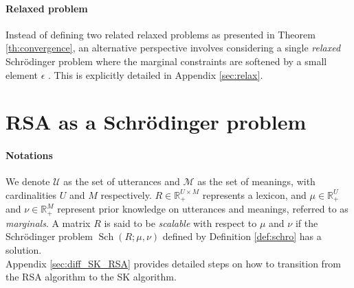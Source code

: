 \documentclass{article}
\newtheorem{prop}{Property}[section] %
\begin{document}
\paragraph{Relaxed problem}
Instead of defining two related relaxed problems as presented in Theorem \ref{th:convergence}, an alternative perspective involves considering a single \textit{relaxed} Schrödinger problem where the marginal constraints are softened by a small element $\epsilon$ \cite{baradat2023convergencesinkhornalgorithmschrodinger}. This is explicitly detailed in Appendix \ref{sec:relax}.

\section{RSA as a Schrödinger problem}\label{sec:RSA_Sch}

\paragraph*{Notations} \label{notation}
We denote $\mathcal{U}$ as the set of utterances and $\mathcal{M}$ as the set of meanings, with cardinalities $U$ and $M$ respectively. $R \in \mathbb{R}^{U \times M}_{+}$ represents a lexicon, and $\mu \in \mathbb{R}^{U}_{+}$ and $\nu \in \mathbb{R}^{M}_{+}$ represent prior knowledge on utterances and meanings, referred to as \textit{marginals}. A matrix $R$ is said to be \textit{scalable} with respect to $\mu$ and $\nu$ if the Schrödinger problem $\operatorname{Sch}(R ; \mu, \nu)$ defined by Definition \ref*{def:schro} has a solution. \\

Appendix \ref{sec:diff_SK_RSA} provides detailed steps on how to transition from the RSA algorithm to the SK algorithm.

\end{document}

